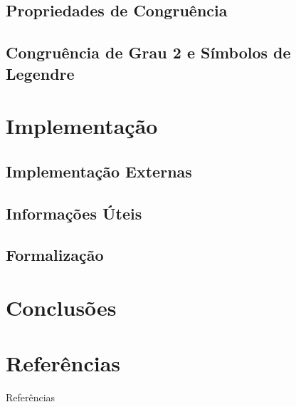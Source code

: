 \documentclass[xcolor=table]{beamer}
\begin{document}
        
        \subsection[]{Propriedades de Congruência} \label{sub:prop-cong}
        
        \subsection[]{Congruência de Grau 2 e Símbolos de Legendre} \label{sub:cong-grau2}
              

    
    
    \section[]{Implementação}
        
        \subsection[]{Implementação Externas}
        
        \subsection[]{Informações Úteis}
        
        \subsection[]{Formalização}
        

    \section[]{Conclusões}

        
   
    \section[]{Referências}
    \begin{frame}[allowframebreaks]{Referências}
        
    \end{frame}
\end{document}
